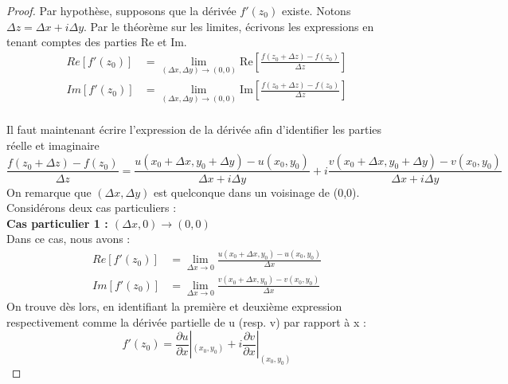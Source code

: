     
\begin{proof}
	Par hypothèse, supposons que la dérivée $f'(z_0)$ existe. Notons $\Delta z = \Delta x +i\Delta y$.
	Par le théorème sur les limites, écrivons les expressions en tenant comptes des parties Re et Im.
	\begin{equation}
		\begin{array}{ll}
			Re[f'(z_0)] & =  \lim\limits_{(\Delta x,\Delta y) \rightarrow (0,0)} \text{Re}\left[\frac{f(z_0+\Delta z) - f(z_0)}{\Delta z} \right] \\
			Im[f'(z_0)] & =  \lim\limits_{(\Delta x,\Delta y) \rightarrow (0,0)} \text{Im}\left[\frac{f(z_0+\Delta z) - f(z_0)}{\Delta z} \right] \\
		\end{array}
	\end{equation}
	    
	Il faut maintenant écrire l'expression de la dérivée afin d'identifier les parties réelle
	et imaginaire
	\begin{equation}
		\frac{f(z_0+\Delta z)-f(z_0)}{\Delta z} = \frac{u(x_0+\Delta x, y_0 + \Delta y) - u(x_0, y_0)}{\Delta x + i\Delta y}
		+ i \frac{v(x_0+\Delta x, y_0 + \Delta y) - v(x_0,y_0)}{\Delta x + i\Delta y}
	\end{equation}
	On remarque que $(\Delta x, \Delta y)$ est quelconque dans un voisinage de (0,0). Considérons
	deux cas particuliers :\\
	    
	\textbf{Cas particulier 1 : $(\Delta x, 0) \rightarrow (0,0)$}\\
	Dans ce cas, nous avons :
	\begin{equation}
		\begin{array}{ll}
			Re[f'(z_0)] & = \lim\limits_{\Delta x\rightarrow 0} \frac{u(x_0+\Delta x, y_0) - u(x_0, y_0)}{\Delta x} \\
			Im[f'(z_0)] & = \lim\limits_{\Delta x\rightarrow 0} \frac{v(x_0+\Delta x, y_0) - v(x_0, y_0)}{\Delta x} 
		\end{array}
	\end{equation}
	On trouve dès lors, en identifiant la première et deuxième expression respectivement comme la dérivée
	partielle de u (resp. v) par rapport à x :
	\begin{equation}
		f'(z_0) = \frac{\partial u}{\partial x}|_{(x_0,y_0)} + i \frac{\partial v}{\partial x}|_{(x_0,y_0)} 
	\end{equation}
	    

\end{proof}
